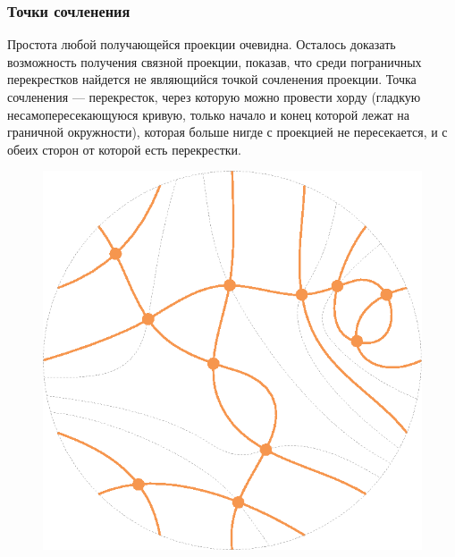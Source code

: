 \documentclass[dvips, intlimits, 9pt, unicode, notheorems, color=usenames,dvipsnames]{beamer}
\theoremstyle{plain}
\theoremstyle{definition}
\begin{document}
	\begin{frame}
		\frametitle{Точки сочленения}

		Простота любой получающейся проекции очевидна. Осталось доказать возможность получения связной проекции, показав,
		что среди пограничных перекрестков найдется не являющийся точкой сочленения проекции. Точка сочленения --- перекресток,
		через которую можно провести хорду (гладкую несамопересекающуюся кривую, только начало и конец которой лежат на граничной
		окружности), которая больше нигде с проекцией не пересекается, и с обеих сторон от которой есть перекрестки.
		\begin{figure}[ht]
			\centering
			\includegraphics[scale = 0.5]{c/cutpoints-proof.eps}
		\end{figure}
	\end{frame}
\end{document}
